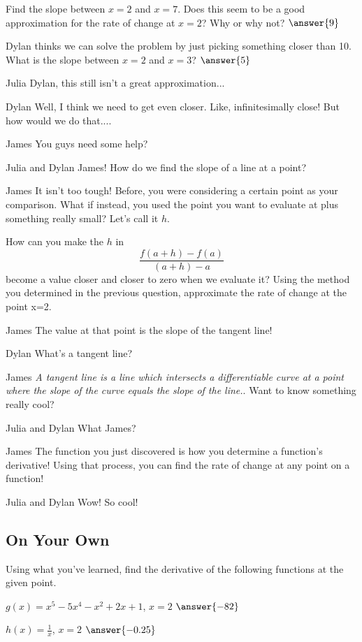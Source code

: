 \documentclass[handout]{ximera}
\begin{document}
\begin{question} Find the slope between $x = 2$ and $x = 7$. Does this seem to be a good approximation for the rate of change at $x = 2$? Why or why not? $\answer{9}$ \end{question}
\begin{question}
Dylan thinks we can solve the problem by just picking something closer than 10. What is the slope between $x = 2$ and $x = 3$? $\answer{5}$ 
\end{question}
\begin{dialogue}
\item[Julia] Dylan, this still isn't a great approximation...
\item[Dylan] Well, I think we need to get even closer. Like, infinitesimally close! But how would we do that....
\item[James] You guys need some help?
\item[Julia and Dylan] James! How do we find the slope of a line at a point?
\item[James] It isn't too tough! Before, you were considering a certain point as your comparison. What if instead, you used the point you want to evaluate at plus something really small? Let's call it $h$.
\end{dialogue}
How can you make the $h$ in $$\frac{f(a+h)-f(a)}{(a+h)-a}$$ become a value closer and closer to zero when we evaluate it?
Using the method you determined in the previous question, approximate the rate of change at the point x=2.
\begin{dialogue}
\item[James] The value at that point is the slope of the tangent line!
\item[Dylan] What's a tangent line?
\item[James] \textit{A tangent line is a line which intersects a differentiable curve at a point where the slope of the curve equals the slope of the line.}. Want to know something really cool?
\item[Julia and Dylan] What James?
\item[James] The function you just discovered is how you determine a function's derivative! Using that process, you can find the rate of change at any point on a function!
\item[Julia and Dylan] Wow! So cool!
\end{dialogue}

\subsection{On Your Own}
Using what you've learned, find the derivative of the following functions at the given point.
\setcounter{problem}{0}
\begin{question}
$g(x) = x^5-5x^4-x^2+2x+1$, $x=2$ $\answer{-82}$
\end{question}
\begin{question}
$h(x) = \frac{1}{x}$, $x=2$ $\answer{-0.25}$
\end{question}
\end{document}
